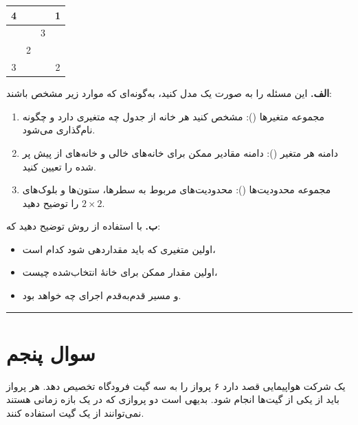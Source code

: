 \documentclass[a4paper,10pt]{article}
\begin{document}
	\begin{center}
		\begin{tabular}{|c|c|c|c|}
			\hline
			4 &   &   & 1 \\ \hline
			&  & 3  &   \\ \hline
			& 2 &  &   \\ \hline
			3 &   &   & 2 \\ \hline
		\end{tabular}
	\end{center}
	
	\textbf{الف.} این مسئله را به صورت یک  مدل کنید، به‌گونه‌ای که موارد زیر مشخص باشند:
	
	\begin{enumerate}
		\item مجموعه متغیرها ():  
		مشخص کنید هر خانه از جدول چه متغیری دارد و چگونه نام‌گذاری می‌شود.
		
		\item دامنه هر متغیر ():  
		دامنه مقادیر ممکن برای خانه‌های خالی و خانه‌های از پیش پر شده را تعیین کنید.
		
		\item مجموعه محدودیت‌ها ():  
		محدودیت‌های مربوط به سطرها، ستون‌ها و بلوک‌های \(2\times 2\) را توضیح دهید.
	\end{enumerate}
	
	\textbf{ب.} با استفاده از روش  توضیح دهید که:
	
	\begin{itemize}
		\item اولین متغیری که باید مقداردهی شود کدام است،
		\item اولین مقدار ممکن برای خانهٔ انتخاب‌شده چیست،
		\item و مسیر قدم‌به‌قدم اجرای  چه خواهد بود.
	\end{itemize}
	
\bigskip
\textcolor{AccentCyan}{\rule{\linewidth}{0.4pt}}



\section{\textcolor{AccentGold}{سوال پنجم}}


	یک شرکت هواپیمایی قصد دارد ۶ پرواز را به سه گیت فرودگاه تخصیص دهد. هر پرواز باید از یکی از گیت‌ها انجام شود. بدیهی است دو پروازی که در یک بازه زمانی هستند نمی‌توانند از یک گیت استفاده کنند.
	
\end{document}
